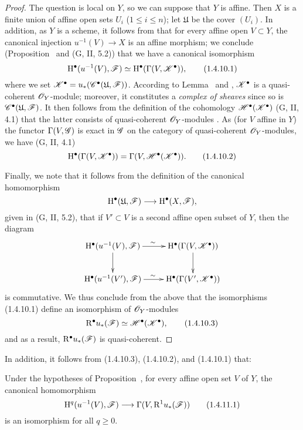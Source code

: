 \begin{proof}
The question is local on $Y$, so we can suppose that $Y$ is affine.
Then $X$ is a finite union of affine open sets $U_i$ ($1\leq i\leq n$); let $\mathfrak{U}$ be the cover $(U_i)$.
In addition, as $Y$ is a scheme, it follows from  that for every affine open $V\subset Y$, the canonical injection $u^{-1}(V)\to X$ is an affine morphism; we conclude (Proposition~ and (G, II, 5.2)) that we have a canonical isomorphism
\[
  \mathrm{H}^\bullet(u^{-1}(V),\mathscr{F})\simeq\mathrm{H}^\bullet(\Gamma(V,\mathscr{K}^\bullet)),
  \tag{1.4.10.1}
\]
where we set $\mathscr{K}^\bullet=u_*(\mathscr{C}^\bullet(\mathfrak{U},\mathscr{F}))$.
According to Lemma~ and , $\mathscr{K}^\bullet$ is a quasi-coherent $\mathscr{O}_Y$-module; moreover, it constitutes a \emph{complex of sheaves} since so is $\mathscr{C}^\bullet(\mathfrak{U},\mathscr{F})$.
It then follows from the definition of the cohomology $\mathscr{H}^\bullet(\mathscr{K}^\bullet)$ (G, II, 4.1) that the latter consists of quasi-coherent $\mathscr{O}_Y$-modules .
As (for $V$ affine in $Y$) the functor $\Gamma(V,\mathscr{G})$ is exact in $\mathscr{G}$ on the category of quasi-coherent $\mathscr{O}_Y$-modules, we have (G, II, 4.1)
\[
  \mathrm{H}^\bullet(\Gamma(V,\mathscr{K}^\bullet))=\Gamma(V,\mathscr{H}^\bullet(\mathscr{K}^\bullet)).
  \tag{1.4.10.2}
\]

Finally, we note that it follows from the definition of the canonical homomorphism
\[
  \HH^\bullet(\mathfrak{U},\sh{F})\to\HH^\bullet(X,\sh{F}),
\]
given in (G, II, 5.2), that if $V'\subset V$ is a second affine open subset of $Y$, then the
diagram
\[
  \xymatrix{
    \HH^\bullet(u^{-1}(V),\sh{F})\ar[r]^\sim\ar[d] &
    \HH^\bullet(\Gamma(V,\sh{K}^\bullet))\ar[d]\\
    \HH^\bullet(u^{-1}(V'),\sh{F})\ar[r]^\sim &
    \HH^\bullet(\Gamma(V',\sh{K}^\bullet))
  }
\]
is commutative.
We thus conclude from the above that the isomorphisms (1.4.10.1) define an isomorphism of $\mathscr{O}_Y$-modules
\[
  \mathrm{R}^\bullet u_*(\mathscr{F})\simeq\mathscr{H}^\bullet(\mathscr{K}^\bullet),
  \tag{1.4.10.3}
\]
and as a result, $\mathrm{R}^\bullet u_*(\mathscr{F})$ is quasi-coherent.
\end{proof}

In addition, it follows from (1.4.10.3), (1.4.10.2), and (1.4.10.1) that:
\begin{corollary}[1.4.11]
\label{III.1.4.11}
Under the hypotheses of Proposition~, for every affine open set $V$ of $Y$, the canonical homomorphism
\[
  \HH^q(u^{-1}(V),\sh{F})\to\Gamma(V,\RR^1 u_*(\sh{F}))
  \tag{1.4.11.1}
\]
is an isomorphism for all $q\geq 0$.
\end{corollary}

